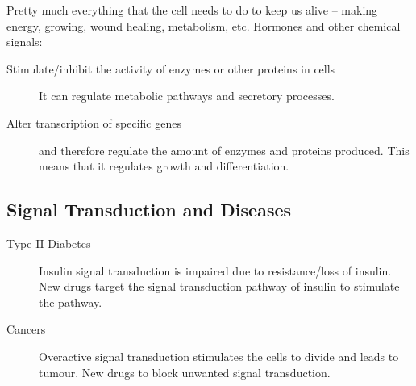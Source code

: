 Pretty much everything that the cell needs to do to keep us alive -- making energy, growing, wound healing, metabolism, etc.
Hormones and other chemical signals:
\begin{description}
\item[Stimulate/inhibit the activity of enzymes or other proteins in cells] It can regulate metabolic pathways and secretory processes.
\item[Alter transcription of specific genes] and therefore regulate the amount of enzymes and proteins produced.
This means that it regulates growth and differentiation.
\end{description}

\subsection{Signal Transduction and Diseases}

\begin{description}
\item[Type II Diabetes] Insulin signal transduction is impaired due to resistance/loss of insulin.
New drugs target the signal transduction pathway of insulin to stimulate the pathway.
\item[Cancers] Overactive signal transduction stimulates the cells to divide and leads to tumour.
New drugs to block unwanted signal transduction.
\end{description}

